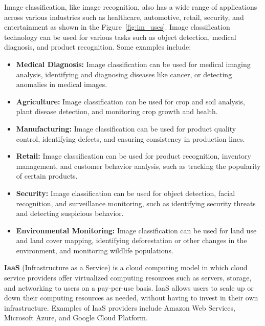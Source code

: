 \documentclass[../main.tex]{subfiles}
\begin{document}
Image classification, like image recognition, also has a wide range of applications across various industries such as healthcare, automotive, retail, security, and entertainment as shown in the Figure~\ref{fig:im_uses}. Image classification technology can be used for various tasks such as object detection, medical diagnosis, and product recognition. Some examples include:
\begin{itemize}
\item \textbf{Medical Diagnosis:} Image classification can be used for medical imaging analysis, identifying and diagnosing diseases like cancer, or detecting anomalies in medical images.
\item \textbf{Agriculture:} Image classification can be used for crop and soil analysis, plant disease detection, and monitoring crop growth and health.
\item \textbf{Manufacturing:} Image classification can be used for product quality control, identifying defects, and ensuring consistency in production lines.
\item \textbf{Retail:} Image classification can be used for product recognition, inventory management, and customer behavior analysis, such as tracking the popularity of certain products.
\item \textbf{Security:} Image classification can be used for object detection, facial recognition, and surveillance monitoring, such as identifying security threats and detecting suspicious behavior.
\item \textbf{Environmental Monitoring:} Image classification can be used for land use and land cover mapping, identifying deforestation or other changes in the environment, and monitoring wildlife populations.
\end{itemize}

\textbf{IaaS} (Infrastructure as a Service) is a cloud computing model in which cloud service providers offer virtualized computing resources such as servers, storage, and networking to users on a pay-per-use basis. IaaS allows users to scale up or down their computing resources as needed, without having to invest in their own infrastructure. Examples of IaaS providers include Amazon Web Services, Microsoft Azure, and Google Cloud Platform.
\end{document}
